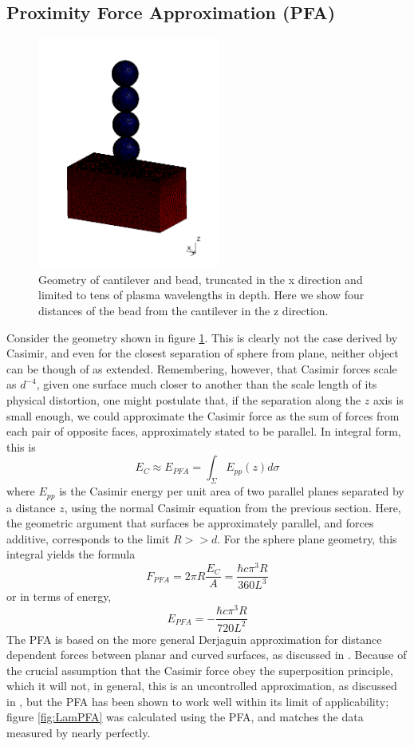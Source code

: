 \documentclass[11pt,traditabstract]{article}
\begin{document}
\subsection{Proximity Force Approximation (PFA)}

\begin{figure}[!h]
\centering
\includegraphics[height=3in]{geometry}
\caption{Geometry of cantilever and bead, truncated in the x direction and limited to tens of plasma wavelengths in depth. Here we show four distances of the bead from the cantilever in the z direction.}\label{fig:geo}
\end{figure}

Consider the geometry shown in figure \ref{fig:geo}. This is clearly not the case derived by Casimir, and even for the closest separation of sphere from plane, neither object can be though of as extended. Remembering, however, that Casimir forces scale as $d^{-4}$, given one surface much closer to another than the scale length of its physical distortion, one might postulate that, if the separation along the $z$ axis is small enough, we could approximate the Casimir force as the sum of forces from each pair of opposite faces, approximately stated to be parallel. In integral form, this is \citep{Dexp}
$$
E_{C}\approx E_{PFA}=\int_{\Sigma}E_{pp}(z)d\sigma
$$
where $E_{pp}$ is the Casimir energy per unit area of two parallel planes separated by a distance $z$, using the normal Casimir equation from the previous section. Here, the geometric argument that surfaces be approximately parallel, and forces additive, corresponds to the limit $R>>d$. For the sphere plane geometry, this integral yields the formula \citep{Durand}
$$
F_{PFA}=2\pi R \frac{E_C}{A}=\frac{\hbar c\pi^3R}{360L^3}
$$
or in terms of energy,
$$
E_{PFA}=-\frac{\hbar c\pi^3R}{720L^2}
$$
The PFA is based on the more general Derjaguin approximation for distance dependent forces between planar and curved surfaces, as discussed in \citet{BeyondPFA}. Because of the crucial assumption that the Casimir force obey the superposition principle, which it will not, in general, this is an uncontrolled approximation, as discussed in \citet{Emig07}, but the PFA has been shown to work well within its limit of applicability; figure \ref{fig:LamPFA} was calculated using the PFA, and matches the data measured by \citet{Lamoreaux} nearly perfectly.
\end{document}
